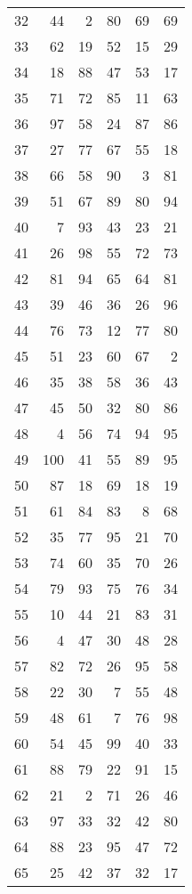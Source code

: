 \begin{tabular}{lrrrrr}
32 &   44 &   2 &  80 &  69 &   69 \\
33 &   62 &  19 &  52 &  15 &   29 \\
34 &   18 &  88 &  47 &  53 &   17 \\
35 &   71 &  72 &  85 &  11 &   63 \\
36 &   97 &  58 &  24 &  87 &   86 \\
37 &   27 &  77 &  67 &  55 &   18 \\
38 &   66 &  58 &  90 &   3 &   81 \\
39 &   51 &  67 &  89 &  80 &   94 \\
40 &    7 &  93 &  43 &  23 &   21 \\
41 &   26 &  98 &  55 &  72 &   73 \\
42 &   81 &  94 &  65 &  64 &   81 \\
43 &   39 &  46 &  36 &  26 &   96 \\
44 &   76 &  73 &  12 &  77 &   80 \\
45 &   51 &  23 &  60 &  67 &    2 \\
46 &   35 &  38 &  58 &  36 &   43 \\
47 &   45 &  50 &  32 &  80 &   86 \\
48 &    4 &  56 &  74 &  94 &   95 \\
49 &  100 &  41 &  55 &  89 &   95 \\
50 &   87 &  18 &  69 &  18 &   19 \\
51 &   61 &  84 &  83 &   8 &   68 \\
52 &   35 &  77 &  95 &  21 &   70 \\
53 &   74 &  60 &  35 &  70 &   26 \\
54 &   79 &  93 &  75 &  76 &   34 \\
55 &   10 &  44 &  21 &  83 &   31 \\
56 &    4 &  47 &  30 &  48 &   28 \\
57 &   82 &  72 &  26 &  95 &   58 \\
58 &   22 &  30 &   7 &  55 &   48 \\
59 &   48 &  61 &   7 &  76 &   98 \\
60 &   54 &  45 &  99 &  40 &   33 \\
61 &   88 &  79 &  22 &  91 &   15 \\
62 &   21 &   2 &  71 &  26 &   46 \\
63 &   97 &  33 &  32 &  42 &   80 \\
64 &   88 &  23 &  95 &  47 &   72 \\
65 &   25 &  42 &  37 &  32 &   17 \\

\end{tabular}
